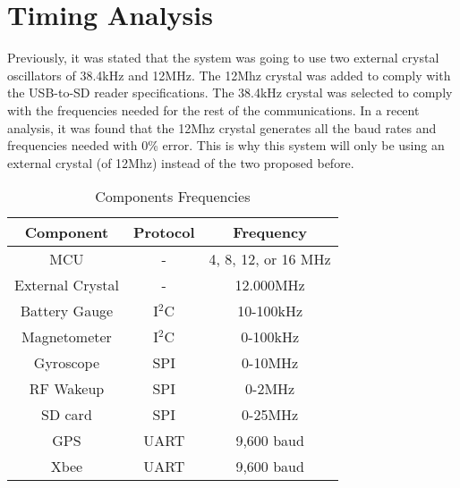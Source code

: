 \section{Timing Analysis}

Previously, it was stated that the system was going to use two external crystal oscillators of 38.4kHz and 12MHz. The 12Mhz crystal was added to comply with the USB-to-SD reader specifications.  The 38.4kHz crystal was selected to comply with the frequencies needed for the rest of the communications. In a recent analysis, it was found that the 12Mhz crystal generates all the baud rates and frequencies needed with 0\% error. This is why this system will only be using an external crystal (of 12Mhz) instead of the two proposed before.   

\begin{table}[H]
  \centering
  \caption{Components Frequencies}
    \begin{tabular}{|c|c|c|}
    \hline
    \rowcolor{Gray}
    Component & Protocol & Frequency \\
    \hline \hline
    MCU   & -     & 4, 8, 12, or 16 MHz \\ \hline
    External Crystal & -     & 12.000MHz \\ \hline
    Battery Gauge & I$^2$C & 10-100kHz \\ \hline
    Magnetometer & I$^2$C & 0-100kHz \\ \hline
    Gyroscope & SPI   & 0-10MHz \\ \hline
    RF Wakeup & SPI   & 0-2MHz \\ \hline
    SD card & SPI   & 0-25MHz \\ \hline
    GPS   & UART  & 9,600 baud \\ \hline
    Xbee  & UART   & 9,600 baud \\ \hline
    \end{tabular}%
  \label{tab:compFreq}%
\end{table}%

